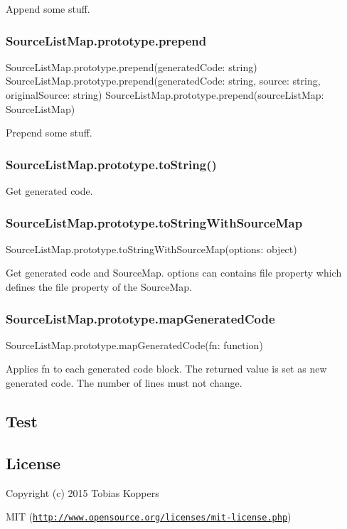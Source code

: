 Append some stuff.

\subsubsection*{{\ttfamily Source\+List\+Map.\+prototype.\+prepend}}


\begin{DoxyCode}
SourceListMap.prototype.prepend(generatedCode: string)
SourceListMap.prototype.prepend(generatedCode: string, source: string, originalSource: string)
SourceListMap.prototype.prepend(sourceListMap: SourceListMap)
\end{DoxyCode}


Prepend some stuff.

\subsubsection*{{\ttfamily Source\+List\+Map.\+prototype.\+to\+String()}}

Get generated code.

\subsubsection*{{\ttfamily Source\+List\+Map.\+prototype.\+to\+String\+With\+Source\+Map}}


\begin{DoxyCode}
SourceListMap.prototype.toStringWithSourceMap(options: object)
\end{DoxyCode}


Get generated code and Source\+Map. {\ttfamily options} can contains {\ttfamily file} property which defines the {\ttfamily file} property of the Source\+Map.

\subsubsection*{{\ttfamily Source\+List\+Map.\+prototype.\+map\+Generated\+Code}}


\begin{DoxyCode}
SourceListMap.prototype.mapGeneratedCode(fn: function)
\end{DoxyCode}


Applies {\ttfamily fn} to each generated code block. The returned value is set as new generated code. The number of lines must not change.

\subsection*{Test}

\href{https://travis-ci.org/webpack/source-list-map}{\tt }

\subsection*{License}

Copyright (c) 2015 Tobias Koppers

M\+IT (\href{http://www.opensource.org/licenses/mit-license.php}{\tt http\+://www.\+opensource.\+org/licenses/mit-\/license.\+php}) 